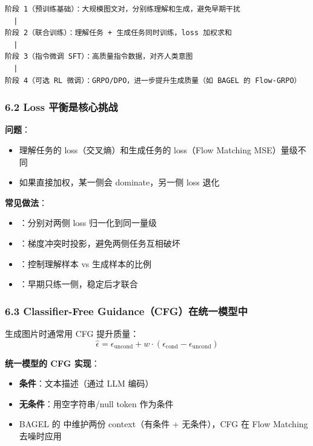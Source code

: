 \begin{lstlisting}
阶段 1（预训练基础）：大规模图文对，分别练理解和生成，避免早期干扰
  |
阶段 2（联合训练）：理解任务 + 生成任务同时训练，loss 加权求和
  |
阶段 3（指令微调 SFT）：高质量指令数据，对齐人类意图
  |
阶段 4（可选 RL 微调）：GRPO/DPO，进一步提升生成质量（如 BAGEL 的 Flow-GRPO）
\end{lstlisting}

\subsubsection{6.2 Loss 平衡是核心挑战}

\begin{warnbox}
\textbf{问题}：
\begin{itemize}
  \item 理解任务的 loss（交叉熵）和生成任务的 loss（Flow Matching MSE）量级不同
  \item 如果直接加权，某一侧会 dominate，另一侧 loss 退化
\end{itemize}
\end{warnbox}

\textbf{常见做法}：
\begin{itemize}
  \item {}：分别对两侧 loss 归一化到同一量级
  \item {}：梯度冲突时投影，避免两侧任务互相破坏
  \item {}：控制理解样本 vs 生成样本的比例
  \item {}：早期只练一侧，稳定后才联合
\end{itemize}

\subsubsection{6.3 Classifier-Free Guidance（CFG）在统一模型中}

生成图片时通常用 CFG 提升质量：
$$\hat{\epsilon} = \epsilon_{\text{uncond}} + w \cdot (\epsilon_{\text{cond}} - \epsilon_{\text{uncond}})$$

\begin{conceptbox}
\textbf{统一模型的 CFG 实现}：
\begin{itemize}
  \item \textbf{条件}：文本描述（通过 LLM 编码）
  \item \textbf{无条件}：用空字符串/null token 作为条件
  \item BAGEL 的  中维护两份 context（有条件 + 无条件），CFG 在 Flow Matching 去噪时应用
\end{itemize}
\end{conceptbox}


